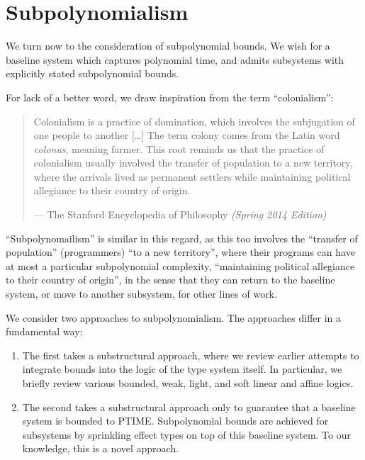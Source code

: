 \part{Subpolynomialism}

We turn now to the consideration of subpolynomial bounds. We wish for a
baseline system which captures polynomial time, and admits subsystems with
explicitly stated subpolynomial bounds.

For lack of a better word, we draw inspiration from the term ``colonialism'':

\begin{quotation}

\footnotesize\sffamily\itshape

Colonialism is a practice of domination, which involves the subjugation of one
people to another [\ldots] The term colony comes from the Latin word
\emph{colonus}, meaning farmer. This root reminds us that the practice of
colonialism usually involved the transfer of population to a new territory,
where the arrivals lived as permanent settlers while maintaining political
allegiance to their country of origin.

\begin{flushright}

\upshape

--- The Stanford Encyclopedia of Philosophy \itshape (Spring 2014 Edition)

\end{flushright}

\end{quotation}

``Subpolynomailism'' is similar in this regard, as this too involves the
``transfer of population'' (programmers) ``to a new territory'', where their
programs can have at most a particular subpolynomial complexity, ``maintaining
political allegiance to their country of origin'', in the sense that they can
return to the baseline system, or move to another subsystem, for other lines of
work.

We consider two approaches to subpolynomialism. The approaches differ in a
fundamental way:

\begin{enumerate}

\item The first takes a substructural approach, where we review earlier
attempts to integrate bounds into the logic of the type system itself. In
particular, we briefly review various bounded, weak, light, and soft linear and
affine logics.

\item The second takes a substructural approach only to guarantee that a
baseline system is bounded to PTIME. Subpolynomial bounds are achieved for
subsystems by sprinkling effect types on top of this baseline system. To our
knowledge, this is a novel approach.

\end{enumerate}

